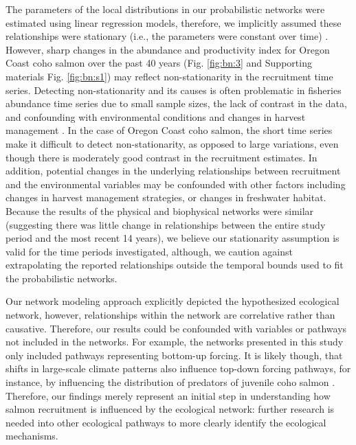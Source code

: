 The parameters of the local distributions in our probabilistic networks were
estimated using linear regression models, therefore, we implicitly assumed these
relationships were stationary (i.e., the parameters were constant over time)
\citep{Walters1987a}. However, sharp changes in the abundance and productivity
index for Oregon Coast coho salmon over the past 40 years (Fig. \ref{fig:bn:3}
and Supporting materials Fig. \ref{fig:bn:s1}) may reflect non-stationarity in the recruitment time
series. Detecting non-stationarity and its causes is often problematic in
fisheries abundance time series due to small sample sizes, the lack of contrast
in the data, and confounding with environmental conditions and changes in
harvest management \citep{Walters1987a, Peterman2009a}. In the case of Oregon
Coast coho salmon, the short time series make it difficult to detect
non-stationarity, as opposed to large variations, even though there is
moderately good contrast in the recruitment estimates. In addition, potential
changes in the underlying relationships between recruitment and the
environmental variables may be confounded with other factors including changes
in harvest management strategies, or changes in freshwater habitat. Because the
results of the physical and biophysical networks were similar (suggesting there
was little change in relationships between the entire study period and the most
recent 14 years), we believe our stationarity assumption is valid for the time
periods investigated, although, we caution against extrapolating the reported
relationships outside the temporal bounds used to fit the probabilistic
networks.

Our network modeling approach explicitly depicted the hypothesized ecological
network, however, relationships within the network are correlative rather than
causative. Therefore, our results could be confounded with variables or pathways
not included in the networks. For example, the networks presented in this study
only included pathways representing bottom-up forcing. It is likely though, that
shifts in large-scale climate patterns also influence top-down forcing pathways,
for instance, by influencing the distribution of predators of juvenile coho
salmon \citep{Pearcy2002a, Perry2005a}. Therefore, our findings merely represent
an initial step in understanding how salmon recruitment is influenced by the
ecological network: further research is needed into other ecological pathways to
more clearly identify the ecological mechanisms.

